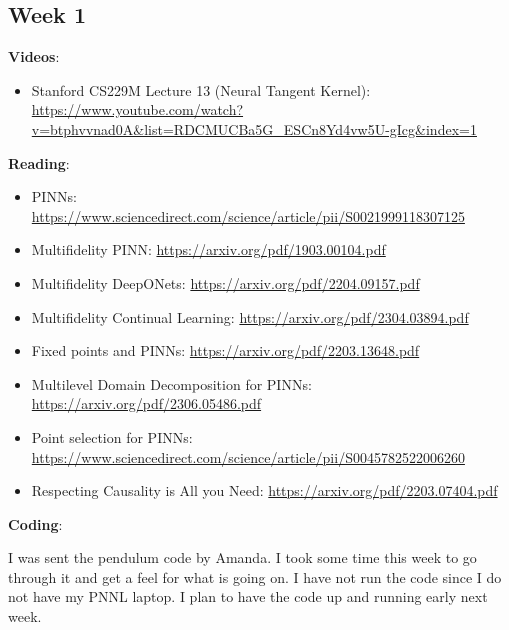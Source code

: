 \documentclass{article}
\def\bf{\textbf}
\begin{document}
\subsection*{Week 1}
\bf{Videos}:
\begin{itemize}
	\item Stanford CS229M Lecture 13 (Neural Tangent Kernel): \url{https://www.youtube.com/watch?v=btphvvnad0A&list=RDCMUCBa5G_ESCn8Yd4vw5U-gIcg&index=1}
\end{itemize}
\bf{Reading}:
\begin{itemize}
	\item PINNs: \url{https://www.sciencedirect.com/science/article/pii/S0021999118307125}
	\item Multifidelity PINN: \url{https://arxiv.org/pdf/1903.00104.pdf}
	\item Multifidelity DeepONets: \url{https://arxiv.org/pdf/2204.09157.pdf}
	\item Multifidelity Continual Learning: \url{https://arxiv.org/pdf/2304.03894.pdf}
	\item Fixed points and PINNs: \url{https://arxiv.org/pdf/2203.13648.pdf}
	\item Multilevel Domain Decomposition for PINNs: \url{https://arxiv.org/pdf/2306.05486.pdf}
	\item Point selection for PINNs: \url{https://www.sciencedirect.com/science/article/pii/S0045782522006260}
	\item Respecting Causality is All you Need: \url{https://arxiv.org/pdf/2203.07404.pdf}
\end{itemize}
\bf{Coding}:\\
\par I was sent the pendulum code by Amanda. I took some time this week to go through it and get a feel for what is going on. I have not run the code since I do not have my PNNL laptop. I plan to have the code up and running early next week.
\end{document}
